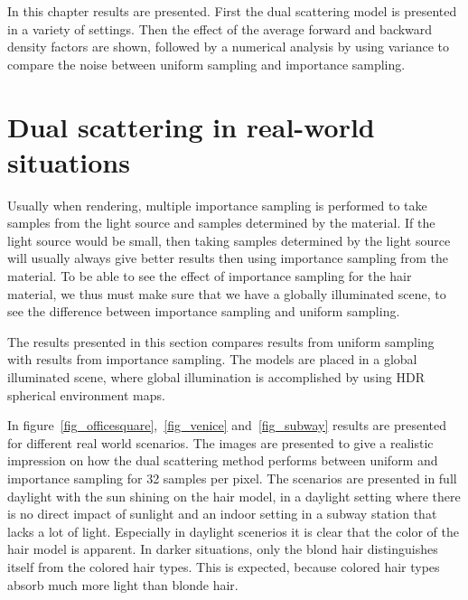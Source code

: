 \documentclass[11pt,a4paper]{report}
\begin{document}
In this chapter results are presented. First the dual scattering model is presented in a variety of settings. Then the effect of the average forward and backward density factors are shown, followed by a numerical analysis by using variance to compare the noise between uniform sampling and importance sampling.


\section{Dual scattering in real-world situations}

Usually when rendering, multiple importance sampling is performed to take samples from the light source and samples determined by the material. If the light source would be small, then taking samples determined by the light source will usually always give better results then using importance sampling from the material. To be able to see the effect of importance sampling for the hair material, we thus must make sure that we have a globally illuminated scene, to see the difference between importance sampling and uniform sampling.

The results presented in this section compares results from uniform sampling with results from importance sampling. The models are placed in a global illuminated scene, where global illumination is accomplished by using HDR spherical environment maps.

In figure~\ref{fig_officesquare},~\ref{fig_venice} and~\ref{fig_subway} results are presented for different real world scenarios. The images are presented to give a realistic impression on how the dual scattering method performs between uniform and importance sampling for 32 samples per pixel. The scenarios are presented in full daylight with the sun shining on the hair model, in a daylight setting where there is no direct impact of sunlight and an indoor setting in a subway station that lacks a lot of light. Especially in daylight scenerios it is clear that the color of the hair model is apparent. In darker situations, only the blond hair distinguishes itself from the colored hair types. This is expected, because colored hair types absorb much more light than blonde hair.
\end{document}
